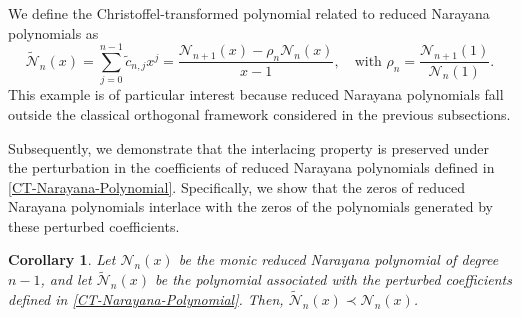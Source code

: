 \documentclass[final,3p,times,12pt]{elsarticle}
\newtheorem{corollary}{Corollary}[section]
\numberwithin{equation}{section}  %
\begin{document}
We define the Christoffel-transformed polynomial related to reduced Narayana polynomials as
\begin{equation}\label{CT-Narayana-Polynomial}
	\tilde{\mathcal{N}}_n(x) = \sum_{j=0}^{n-1} \tilde{c}_{n,j} x^j= \frac{\mathcal{N}_{n+1}(x) - \rho_n \mathcal{N}_n(x)}{x - 1}, \quad \text{with } \rho_n = \frac{\mathcal{N}_{n+1}(1)}{\mathcal{N}_n(1)}.
\end{equation}
This example is of particular interest because reduced Narayana polynomials fall outside the classical orthogonal framework considered in the previous subsections. 

Subsequently, we demonstrate that the interlacing property is preserved under the perturbation in the coefficients of reduced Narayana polynomials defined in \eqref{CT-Narayana-Polynomial}. Specifically, we show that the zeros of reduced Narayana polynomials interlace with the zeros of the polynomials generated by these perturbed coefficients.

\begin{corollary}\label{cor:interlace_narayana}
	Let $\mathcal{N}_{n}(x)$ be the monic reduced Narayana polynomial of degree $n-1$, and let $\tilde{\mathcal{N}}_{n}(x)$ be the polynomial associated with the perturbed coefficients defined in \eqref{CT-Narayana-Polynomial}. Then, $\tilde{\mathcal{N}}_{n}(x)\prec \mathcal{N}_{n}(x)$.
\end{corollary}
\end{document}
